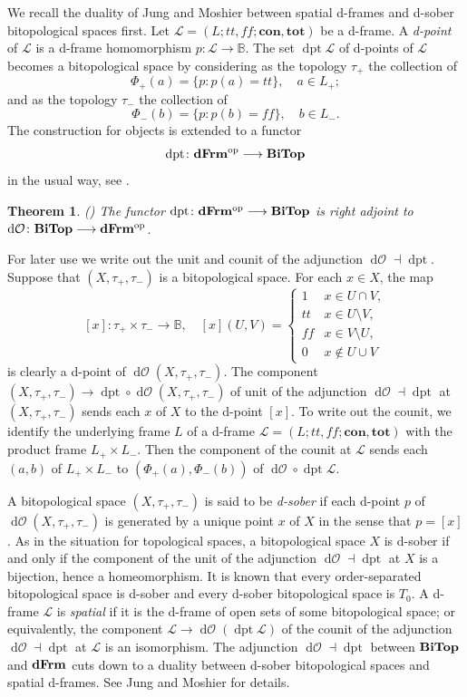 \documentclass[11pt]{article}
\DeclareMathOperator{\dO}{d\mathcal{O}}
\DeclareMathOperator{\dpt}{dpt}
\theoremstyle{plain}
\newtheorem{thm}{Theorem}[section]
\theoremstyle{definition}
\newcommand{\bbB}{\mathbb{B}}
\newcommand{\dbt}{{t\!t}}
\newcommand{\dbf}{{f\!\!f}}
\newcommand{\dFrm}{\bf dFrm}
\newcommand{\lra}{\longrightarrow}
\begin{document}
We recall the duality of Jung and Moshier between spatial d-frames and d-sober bitopological spaces first. Let $\mathcal{L}=(L;\dbt,\dbf; \mathbf{con}, \mathbf{tot})$ be  a d-frame.  A \emph{d-point} \cite[Definition 3.4]{JM2008} of  $\mathcal{L}$  is a d-frame homomorphism $p\colon\mathcal{L}\lra\bbB$. The set $\dpt \mathcal{L}$ of d-points of  $\mathcal{L}$ becomes a bitopological space by considering  as the topology $\tau_+$ the collection of $$\Phi_+(a) =\{p :p(a)= \dbt\},\quad a\in L_+;$$   and as the topology $\tau_-$ the collection of $$\Phi_-(b) =\{p:p(b)= \dbf\},\quad b\in L_-.$$    
The construction for objects is extended to a  functor 
$$\dpt\colon \dFrm^{\rm op}\lra \bf{BiTop}$$ in the usual way, see \cite{JM2006,JM2008}.

\begin{thm}{\rm(\cite[Theorem 3.5]{JM2008})} The functor 
$\dpt \colon \dFrm^{\rm op}\lra \bf{BiTop}$ is right adjoint to  $\dO\colon\bf{BiTop}\lra \dFrm^{\rm op}$. 
\end{thm}

For later use we write out the unit and counit of the adjunction $\dO\dashv\dpt$. Suppose that $(X,\tau_+,\tau_-)$ is a bitopological space. For each $x\in X$, the map $$[x]\colon\tau_+\times\tau_-\lra\bbB, \quad [x](U,V) =\begin{cases}1 &x\in U\cap V, \\ \dbt &x\in U\setminus V,\\ \dbf & x\in V\setminus U,\\ 0 &x\notin U\cup V \end{cases}$$ is clearly a d-point of  $\dO(X,\tau_+,\tau_-)$. The component  $ (X,\tau_+,\tau_-)\lra \dpt\circ\dO(X,\tau_+,\tau_-)$  of unit of the adjunction $\dO\dashv\dpt$ at $(X,\tau_+,\tau_-)$ sends each $x$ of $X$ to the d-point $[x]$. To write out the counit, we identify the underlying frame $L$ of a d-frame $\mathcal{L}=(L;\dbt,\dbf; \mathbf{con}, \mathbf{tot})$ with the product frame $L_+\times L_-$. Then the  component of the counit at $\mathcal{L}$ sends each   $(a,b)$ of $L_+\times L_-$ to  $(\Phi_+(a),\Phi_-(b))$ of $\dO\circ\dpt\mathcal{L}$.
 
A bitopological space $(X,\tau_+,\tau_-)$ is said to be \emph{d-sober} if each d-point $p$ of  $\dO(X,\tau_+,\tau_-) $  is generated by a unique point $x$ of $X$ in the sense that $p=[x]$. As in the situation for topological spaces, a bitopological space $X$ is d-sober if and only if the component of the unit of the adjunction $\dO\dashv\dpt$ at $X$ is a bijection, hence a homeomorphism. It is known that every order-separated bitopological space is d-sober \cite[Theorem 4.13]{JM2006} and  every d-sober bitopological space is $T_0$.
A d-frame $\mathcal{L}$ is  \emph{spatial}  if it is the d-frame of open sets of some bitopological space; or equivalently, the component $\mathcal{L}\lra \dO(\dpt \mathcal{L})$ of the counit of the adjunction $\dO\dashv\dpt$ at $\mathcal{L}$ is an isomorphism.  The adjunction $\dO\dashv\dpt$ between $\bf{BiTop}$ and $\bf{dFrm}$ cuts down to a duality between  d-sober bitopological spaces and  spatial d-frames. See Jung and Moshier \cite{JM2006, JM2008} for details.
\end{document}
